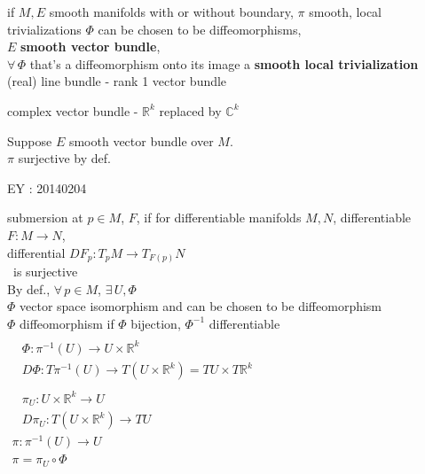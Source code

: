 \documentclass[twoside]{amsart}
\theoremstyle{plain}
\theoremstyle{definition}
\newcommand{\exercisehead}[1]
  { \smallskip
   \noindent{\small\bf Exercise #1.}
  }
\begin{document}
if $M, E$ smooth manifolds with or without boundary, $\pi$ smooth, local trivializations $\Phi$ can be chosen to be diffeomorphisms, \\
$E$ \textbf{smooth vector bundle}, \\
$\forall \, \Phi$ that's a diffeomorphism onto its image a \textbf{ smooth local trivialization} \\

(real) line bundle - rank 1 vector bundle 

complex vector bundle - $\mathbb{R}^k$ replaced by $\mathbb{C}^k$

\exercisehead{10.1} Suppose $E$ smooth vector bundle over $M$. \\
$\pi$ surjective by def.  

EY : 20140204

submersion at $p \in M$, $F$, if for differentiable manifolds $M, N$, differentiable $F: M \to N$, \\
\quad differential $DF_p : T_p M \to T_{F(p)}N$ \\
\quad \, is surjective \\

By def., $\forall \, p \in M$, $\exists \, U, \Phi$ \\
\quad $\Phi$ vector space isomorphism and can be chosen to be diffeomorphism \\
\quad $\Phi$ diffeomorphism if $\Phi$ bijection, $\Phi^{-1}$ differentiable \\

$\begin{aligned}
& \quad \\ 
  & \Phi: \pi^{-1}(U) \to U \times \mathbb{R}^k \\
  & D\Phi : T\pi^{-1}(U) \to T(U \times \mathbb{R}^k ) = TU \times T\mathbb{R}^k 
\end{aligned}$ \\

$\begin{aligned} 
  & \quad \\
  & \pi_U : U \times \mathbb{R}^k \to U \\
  & D\pi_U : T(U \times \mathbb{R}^k ) \to TU \end{aligned}$  \\

$\begin{gathered}
\pi:\pi^{-1}(U) \to U \\
\pi = \pi_U \circ \Phi \end{gathered}$ \\
\end{document}
